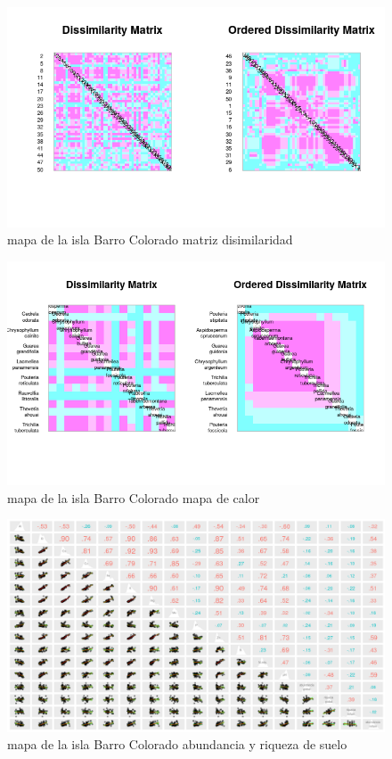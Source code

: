 \documentclass[11pt,]{article}
\begin{document}
\begin{figure}
\centering
\includegraphics[width=1.00000\textwidth]{matriz_similaridad.png}
\caption{mapa de la isla Barro Colorado matriz disimilaridad
\label{fig:bci_map}}
\end{figure}

\begin{figure}
\centering
\includegraphics[width=1.00000\textwidth]{mapadecalor.png}
\caption{mapa de la isla Barro Colorado mapa de calor
\label{fig:bci_map}}
\end{figure}

\begin{figure}
\centering
\includegraphics[width=1.00000\textwidth]{matriz_correlacion_suelo_abun_riq_spearman.png}
\caption{mapa de la isla Barro Colorado abundancia y riqueza de suelo
\label{fig:bci_map}}
\end{figure}
\end{document}
